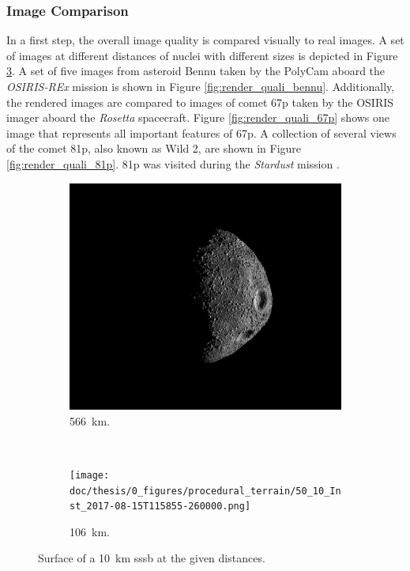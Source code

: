 \subsubsection{Image Comparison}
In a first step, the overall image quality is compared visually to real images. A set of images at different distances of nuclei with different sizes is depicted in Figure \ref{fig:render_quali_comparison}. A set of five images from asteroid Bennu taken by the PolyCam aboard the \textit{OSIRIS-REx} mission is shown in Figure \ref{fig:render_quali_bennu}. Additionally, the rendered images are compared to images of comet \gls{67p} taken by the OSIRIS imager aboard the \textit{Rosetta} spacecraft. Figure \ref{fig:render_quali_67p} shows one image that represents all important features of \gls{67p}. A collection of several views of the comet \gls{81p}, also known as Wild 2, are shown in Figure \ref{fig:render_quali_81p}. \Gls{81p} was visited during the \textit{Stardust} mission \cite{Brownlee2003Stardust:Mission}.

\begin{figure}[htb]
    \centering
        \begin{subfigure}[b]{0.48\textwidth}
            \centering
                \includegraphics[width=\textwidth]{doc/thesis/0_figures/procedural_terrain/50_10_Inst_2017-08-15T115755-845000.png}
            \caption{\SI{566}{\kilo\meter}.}
            \label{fig:render_quali_comparison_1}
        \end{subfigure}
        \\
        \begin{subfigure}[b]{0.48\textwidth}
            \centering
                \texttt{[image: doc/thesis/0\_figures/procedural\_terrain/50\_10\_Inst\_2017-08-15T115855-260000.png]}
            \caption{\SI{106}{\kilo\meter}.}
            \label{fig:render_quali_comparison_2}
        \end{subfigure}
    \caption{Surface of a \SI{10}{\kilo\meter} \gls{sssb} at the given distances.}
    \label{fig:render_quali_comparison}
\end{figure}

